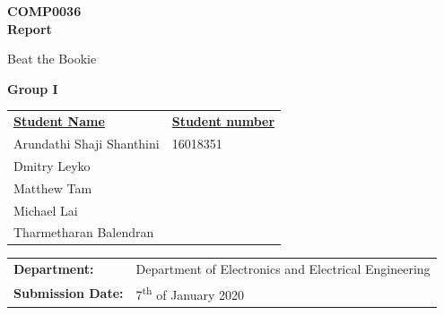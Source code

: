 \documentclass[a4paper,12pt]{article}
\begin{document}
	\selectfont
	\begin{titlepage}
		\setlength{\voffset}{-1.5in}
		\noindent {}
			
			\vspace{15mm}
			
			\begin{center}
				{\Huge \textbf{COMP0036 \\ \vspace{10mm} Report}}
			
				\vspace{8mm}
			
				\begin{spacing}{1.8}
					{\huge Beat the Bookie}
				\end{spacing}
		
			
				\vspace{12mm}
			
				{\LARGE \textbf{Group I}}
				
				\vspace{10mm}
				
				\begin{tabular}{ll}
					\underline{\textbf{Student Name}}  & \hspace{4mm} \underline{\textbf{Student number}} \vspace{2mm} \\
					Arundathi Shaji Shanthini & \hspace{4mm} 16018351 \\ 
					Dmitry Leyko & \hspace{4mm}  \\ 
					Matthew Tam & \hspace{4mm}  \\ 
					Michael Lai & \hspace{4mm} \\ 
					Tharmetharan Balendran & \hspace{4mm} \\ 
				\end{tabular}
				
				\vspace{13mm}
				
				\begin{tabular}{ll}
					\textbf{Department:} &  Department of Electronics and Electrical Engineering\\ \vspace{3mm}
					\textbf{Submission Date:} &  7\textsuperscript{th} of January 2020
				\end{tabular}
			\end{center}
	\end{titlepage}
	
\end{document}
